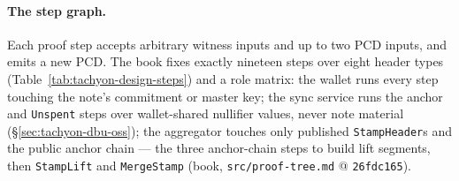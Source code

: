 \documentclass[11pt,a4paper]{article}
\theoremstyle{definition}
\begin{document}
\paragraph{The step graph.} Each proof step accepts arbitrary witness
inputs and up to two PCD inputs, and emits a new PCD. The book fixes
exactly nineteen steps over eight header types
(Table~\ref{tab:tachyon-design-steps}) and a role matrix: the wallet runs
every
step touching the note's commitment or master key; the sync service runs
the anchor and \texttt{Unspent} steps over wallet-shared nullifier values,
never note material (\S\ref{sec:tachyon-dbu-oss}); the aggregator touches
only published \texttt{StampHeader}s and the public anchor chain --- the
three anchor-chain steps to build lift segments, then \texttt{StampLift}
and \texttt{MergeStamp} (book, \texttt{src/proof-tree.md} @
\texttt{26fdc165}).
\end{document}
